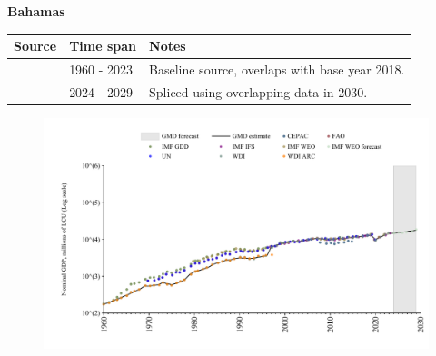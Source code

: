 \documentclass[12pt,a4paper,landscape]{article}
\begin{document}
\begin{adjustbox}{max totalsize={\paperwidth}{\paperheight},center}
\begin{minipage}[t][\textheight][t]{\textwidth}
\vspace*{0.5cm}
{}
\begin{center}
{\Large\bfseries Bahamas}
\end{center}
\vspace{0.5cm}
\begin{table}[H]
\centering
\small
\begin{tabular}{|l|l|l|}
\hline
\textbf{Source} & \textbf{Time span} & \textbf{Notes} \\
\hline
\rowcolor{white}\cite{WDI}& 1960 - 2023 &Baseline source, overlaps with base year 2018.\\
\rowcolor{lightgray}\cite{IMF_WEO_forecast}& 2024 - 2029 &Spliced using overlapping data in 2030.\\
\hline
\end{tabular}
\end{table}
\begin{figure}[H]
\centering
\includegraphics[width=\textwidth,height=0.6\textheight,keepaspectratio]{graphs/BHS_nGDP.pdf}
\end{figure}
\end{minipage}
\end{adjustbox}
\end{document}
